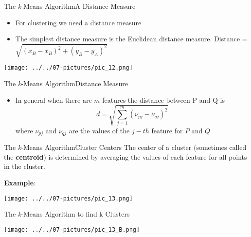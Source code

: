 \documentclass[11pt]{beamer}
\begin{document}
\begin{frame}{The \textit{k}-Means Algorithm}{A Distance Measure}
	\begin{itemize}
		\item For clustering we need a distance measure
		\item The simplest distance measure is the Euclidean distance measure. Distance = $\sqrt{(x_B-x_B)^2 + (y_B - y_A)^2}$
	\end{itemize}
	\begin{center}
	\texttt{[image: ../../07-pictures/pic\_12.png]}
	\end{center}
\end{frame}
\begin{frame}{The \textit{k}-Means Algorithm}{Distance Measure}
	\begin{itemize}
		\item In general when there are $m$ features the distance between P and Q is
		\begin{equation}
			d = \sqrt{\sum\limits_{j=1}^m \left( \nu_{pj} - \nu_{qj} \right)^2}
		\end{equation}		   
		where $\nu_{pj}$  and $\nu_{qj}$ are the values of the $j-th$ feature for $P$ and $Q$
	\end{itemize}
\end{frame}
\begin{frame}{The \textit{k}-Means Algorithm}{Cluster Centers}
	The center of a cluster (sometimes called the \textbf{centroid}) is determined by averaging the values of each feature for all points in the cluster. 
	
	\textbf{Example}:
	 
	\begin{center}
	\texttt{[image: ../../07-pictures/pic\_13.png]}
	\end{center}
\end{frame}
\begin{frame}{The \textit{k}-Means Algorithm to find k Clusters}
	\begin{center}
	\texttt{[image: ../../07-pictures/pic\_13\_B.png]}
	\end{center}
\end{frame}
\end{document}
